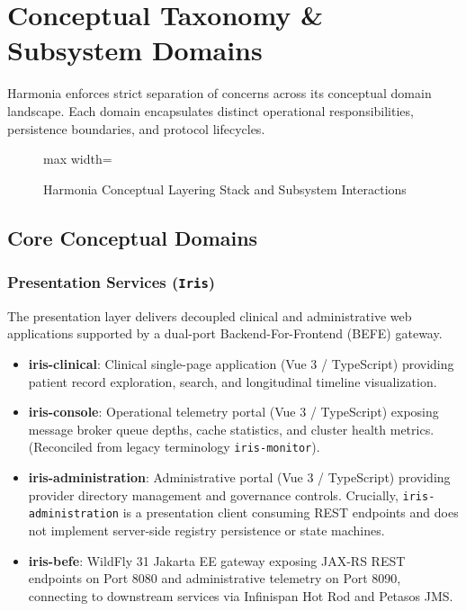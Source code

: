 
\chapter{Conceptual Taxonomy \& Subsystem Domains}
\label{chap:conceptual_taxonomy}

Harmonia enforces strict separation of concerns across its conceptual domain landscape. Each domain encapsulates distinct operational responsibilities, persistence boundaries, and protocol lifecycles.

\begin{figure}[htbp]
    \centering
    \begin{adjustbox}{max width=\textwidth}
        
    \end{adjustbox}
    \caption{Harmonia Conceptual Layering Stack and Subsystem Interactions}
    \label{fig:conceptual_layers}
\end{figure}

\section{Core Conceptual Domains}

\subsection{Presentation Services (\texttt{Iris})}
The presentation layer delivers decoupled clinical and administrative web applications supported by a dual-port Backend-For-Frontend (BEFE) gateway.
\begin{itemize}
    \item \textbf{iris-clinical}: Clinical single-page application (Vue 3 / TypeScript) providing patient record exploration, search, and longitudinal timeline visualization.
    \item \textbf{iris-console}: Operational telemetry portal (Vue 3 / TypeScript) exposing message broker queue depths, cache statistics, and cluster health metrics. (Reconciled from legacy terminology \texttt{iris-monitor}).
    \item \textbf{iris-administration}: Administrative portal (Vue 3 / TypeScript) providing provider directory management and governance controls. Crucially, \texttt{iris-administration} is a presentation client consuming REST endpoints and does not implement server-side registry persistence or state machines.
    \item \textbf{iris-befe}: WildFly 31 Jakarta EE gateway exposing JAX-RS REST endpoints on Port 8080 and administrative telemetry on Port 8090, connecting to downstream services via Infinispan Hot Rod and Petasos JMS.
\end{itemize}

